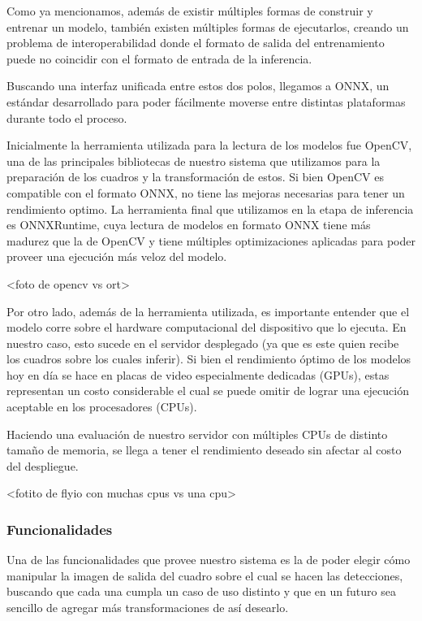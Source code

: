 \documentclass[a4paper]{article}
\begin{document}
Como ya mencionamos, además de existir múltiples formas de construir y entrenar un modelo, también existen múltiples formas de ejecutarlos, creando un problema de interoperabilidad donde el formato de salida del entrenamiento puede no coincidir con el formato de entrada de la inferencia.

Buscando una interfaz unificada entre estos dos polos, llegamos a ONNX, un estándar desarrollado para poder fácilmente moverse entre distintas plataformas durante todo el proceso.

Inicialmente la herramienta utilizada para la lectura de los modelos fue OpenCV, una de las principales bibliotecas de nuestro sistema que utilizamos para la preparación de los cuadros y la transformación de estos. Si bien OpenCV es compatible con el formato ONNX, no tiene las mejoras necesarias para tener un rendimiento optimo. La herramienta final que utilizamos en la etapa de inferencia es ONNXRuntime, cuya lectura de modelos en formato ONNX tiene más madurez que la de OpenCV y tiene múltiples optimizaciones aplicadas para poder proveer una ejecución más veloz del modelo.

<foto de opencv vs ort>

Por otro lado, además de la herramienta utilizada, es importante entender que el modelo corre sobre el hardware computacional del dispositivo que lo ejecuta. En nuestro caso, esto sucede en el servidor desplegado (ya que es este quien recibe los cuadros sobre los cuales inferir). Si bien el rendimiento óptimo de los modelos hoy en día se hace en placas de video especialmente dedicadas (GPUs), estas representan un costo considerable el cual se puede omitir de lograr una ejecución aceptable en los procesadores (CPUs).

Haciendo una evaluación de nuestro servidor con múltiples CPUs de distinto tamaño de memoria, se llega a tener el rendimiento deseado sin afectar al costo del despliegue.

<fotito de flyio con muchas cpus vs una cpu>

\subsubsection{Funcionalidades}

Una de las funcionalidades que provee nuestro sistema es la de poder elegir cómo manipular la imagen de salida del cuadro sobre el cual se hacen las detecciones, buscando que cada una cumpla un caso de uso distinto y que en un futuro sea sencillo de agregar más transformaciones de así desearlo.
\end{document}
